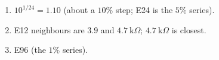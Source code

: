 \begin{enumerate}[leftmargin=1.6em,itemsep=2pt]
\item $10^{1/24} = 1.10$ (about a $10\%$ step; E24 is the $5\%$ series).
\item E12 neighbours are $3.9$ and $4.7\ \text{k}\Omega$; $4.7\ \text{k}\Omega$ is closest.
\item E96 (the $1\%$ series).
\end{enumerate}
